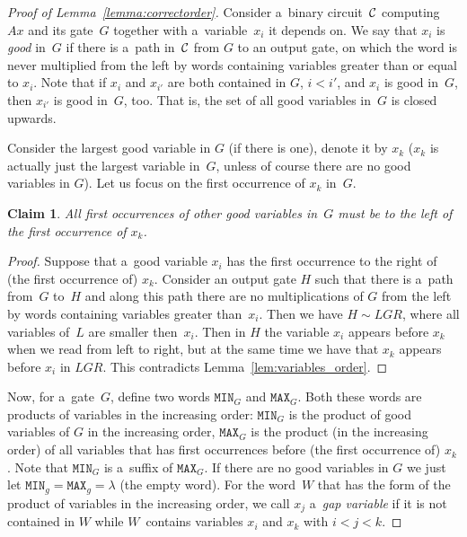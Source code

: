 \documentclass[11pt,letterpaper]{article}
\newtheorem{claim}{Claim}
\newcommand{\mmin}{\texttt{MIN}}
\newcommand{\mmax}{\texttt{MAX}}
\begin{document}
\begin{proof}[Proof of Lemma~\ref{lemma:correctorder}]
Consider a~binary circuit~${\cal C}$ computing~$Ax$ and its gate~$G$ together with a~variable~$x_i$ it depends on.
We say that $x_i$ is \emph{good} in~$G$ if there is
a~path in~${\cal C}$ from $G$ to an output gate, on which the word is never multiplied from the left by words containing variables greater than or equal to $x_i$.
Note that if $x_i$ and $x_{i'}$ are both contained in $G$, $i<i'$, and $x_i$ is good in~$G$, then $x_{i'}$ is good in~$G$, too. That is, the set of all good variables in~$G$ is closed upwards.

Consider the largest good variable in $G$ (if there is one), denote it by $x_k$ ($x_k$ is actually just the largest variable in~$G$, unless of course there are no good variables in $G$). Let us focus on the first occurrence of $x_k$ in~$G$.

\begin{claim}
All first occurrences of other good variables in~$G$ must be to the left of the first occurrence of $x_k$.
\end{claim}

\begin{proof}
Suppose that a~good variable $x_i$ has the first occurrence to the right of (the first occurrence of) $x_k$. Consider an output gate $H$ such that there is a~path from~$G$ to~$H$ and along this path there are no multiplications of $G$ from the left by words containing variables greater than~$x_i$. Then we have $H \sim LGR$, where all variables of~$L$ are smaller then~$x_i$. Then in $H$ the variable $x_i$ appears before $x_k$ when we read from left to right, but at the same time we have that $x_k$ appears before $x_i$ in $LGR$. This contradicts Lemma~\ref{lem:variables_order}.
\end{proof}

Now, for a~gate~$G$, define two words $\mmin_G$ and $\mmax_G$. Both these words are products of variables in the increasing order: $\mmin_G$ is the product of good variables of $G$ in the increasing order, $\mmax_G$ is the product (in the increasing order) of all variables that has first occurrences before (the first occurrence of) $x_k$. Note that $\mmin_G$ is
a~suffix of $\mmax_G$. If there are no good variables in $G$ we just let $\mmin_g=\mmax_g=\lambda$ (the empty word).
%
For the word~$W$ that has the form of the product of variables in the increasing order, we call $x_j$ a~\emph{gap variable} if it is not contained in $W$
while $W$~contains variables $x_i$ and $x_k$ with $i < j < k$.


\end{proof}
\end{document}
